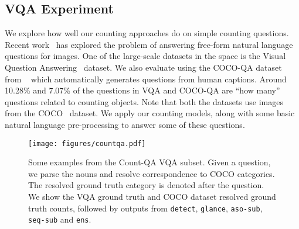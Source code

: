 \documentclass[10pt,twocolumn,letterpaper]{article}
\newcommand{\detect}{\texttt{detect}\xspace}
\newcommand{\sub}{\texttt{aso-sub}\xspace}
\newcommand{\seq}{\texttt{seq-sub}\xspace}
\newcommand{\glance}{\texttt{glance}\xspace}
\newcommand{\ens}{\texttt{ens}\xspace}
\begin{document}
\subsection{VQA Experiment}\label{subsec:vqa_exp_paper}
We explore how well our counting approaches do on simple counting questions. Recent work~\cite{vqa,Ren2015ExploringAnswering,Malinowski2015AskImages,FukuiPYRDR16} has explored the problem of answering free-form natural language questions for images. One of the large-scale datasets in the space is the Visual Question Answering~\cite{vqa} dataset. 
We also evaluate using the COCO-QA dataset from ~\cite{Ren2015ExploringAnswering} which automatically generates questions from human captions. Around 10.28\% and 7.07\% of the questions in VQA and COCO-QA are ``how many'' questions related to counting objects. Note that both the datasets use images from the COCO~\cite{LinECCV14coco} dataset. We apply our counting models, along with some basic natural language pre-processing to answer some of these questions.

\begin{figure}[t]
\texttt{[image: figures/countqa.pdf]}
\vspace{-15pt}
\caption{\footnotesize{Some examples from the Count-QA VQA subset. Given a question, we parse the nouns and resolve correspondence to COCO categories. The resolved ground truth category is denoted after the question. We show the VQA ground truth and COCO dataset resolved ground truth counts, followed by outputs from \detect{}, \glance, \sub{}, \seq{} and \ens{}.\vspace{4pt}}}
\label{exp:vqa}
\vspace{-15pt}
\end{figure}
\end{document}
